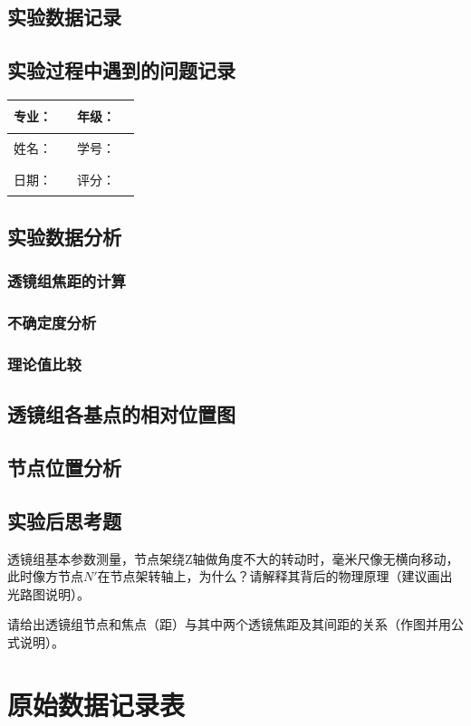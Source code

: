\documentclass[dvipsnames, svgnames,a4paper,11pt]{article}
\newcommand{\recordblank}[1]{\par\vspace*{#1}\par}
\begin{document}
\subsection{实验数据记录}
\recordblank{18cm}
\clearpage
\recordblank{5.0cm}
\subsection{实验过程中遇到的问题记录}
\recordblank{5.0cm}
\clearpage
\noindent\begin{minipage}{\textwidth}
	\renewcommand\arraystretch{1.7}
	\begin{tabularx}{\textwidth}{|X|X|X|X|}
	\hline
	专业：& \rule{2.5cm}{0.4pt} & 年级：& \rule{2.5cm}{0.4pt}\\
	\hline
	姓名：& \rule{2.5cm}{0.4pt} & 学号：& \rule{2.5cm}{0.4pt}\\
	\hline
	日期：& \rule{2.5cm}{0.4pt} & 评分：& \rule{2.5cm}{0.4pt}\\
	\hline
	\end{tabularx}
\vspace{0.8em}
\subsection{实验数据分析}
\subsubsection{透镜组焦距的计算}
\recordblank{3.5cm}
\end{minipage}

\subsubsection{不确定度分析}
\recordblank{3.5cm}
\subsubsection{理论值比较}
\recordblank{3.5cm}
\subsection{透镜组各基点的相对位置图}
\recordblank{3.5cm}
\subsection{节点位置分析}
\recordblank{3.5cm}
\subsection{实验后思考题}

\begin{question}
透镜组基本参数测量，节点架绕Z轴做角度不大的转动时，毫米尺像无横向移动，此时像方节点$N'$在节点架转轴上，为什么？请解释其背后的物理原理（建议画出光路图说明）。
\end{question}
\recordblank{4cm}



\begin{question}
请给出透镜组节点和焦点（距）与其中两个透镜焦距及其间距的关系（作图并用公式说明）。
\end{question}
\recordblank{4cm}

\clearpage
\appendix
\section{原始数据记录表}
\recordblank{5.0cm}
\end{document}
